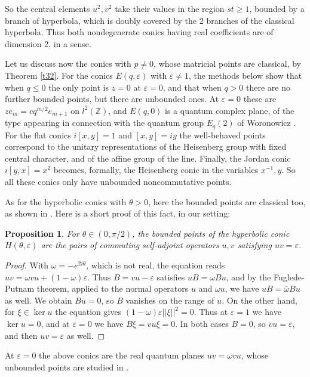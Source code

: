 \documentclass[11pt]{amsart}
\newtheorem{proposition}[theorem]{Proposition}
\theoremstyle{definition}
\begin{document}
So the central elements $u^2,v^2$ take their values in the region $st\geq1$, bounded by a branch of hyperbola, which is doubly covered by the 2 branches of the classical hyperbola. Thus both nondegenerate conics having real coefficients are of dimension 2, in a sense.

Let us discuss now the conics with $p\neq0$, whose matricial points are classical, by Theorem \ref{t32}. For the conics $E(q,\varepsilon)$ with $\varepsilon\neq1$, the methods below show that when $q\leq0$ the only point is $z=0$ at $\varepsilon=0$, and that when $q>0$ there are no further bounded points, but there are unbounded ones. At $\varepsilon=0$ these are $ze_m=cq^{m/2}e_{m+1}$ on $l^2(\mathbb Z)$, and $E(q,0)$ is a quantum complex plane, of the type appearing in connection with the quantum group $E_q(2)$ of Woronowicz \cite{wo1}. For the flat conics $i[x,y]=1$ and $[x,y]=iy$ the well-behaved points correspond to the unitary representations of the Heisenberg group with fixed central character, and of the affine group of the line. Finally, the Jordan conic $i[y,x]=x^2$ becomes, formally, the Heisenberg conic in the variables $x^{-1},y$. So all these conics only have unbounded noncommutative points.

As for the hyperbolic conics with $\theta>0$, here the bounded points are classical too, as shown in \cite{os1}. Here is a short proof of this fact, in our setting:

\begin{proposition}\label{p43}
For $\theta\in(0,\pi/2)$, the bounded points of the hyperbolic conic $H(\theta,\varepsilon)$ are the pairs of commuting self-adjoint operators $u,v$ satisfying $uv=\varepsilon$.
\end{proposition}

\begin{proof}
With $\omega=-e^{2i\theta}$, which is not real, the equation reads $uv=\omega vu+(1-\omega)\varepsilon$. Thus $B=vu-\varepsilon$ satisfies $uB=\omega Bu$, and by the Fuglede-Putnam theorem, applied to the normal operators $u$ and $\omega u$, we have $uB=\bar\omega Bu$ as well. We obtain $Bu=0$, so $B$ vanishes on the range of $u$. On the other hand, for $\xi\in\ker u$ the equation gives $(1-\omega)\varepsilon||\xi||^2=0$. Thus at $\varepsilon=1$ we have $\ker u=0$, and at $\varepsilon=0$ we have $B\xi=vu\xi=0$. In both cases $B=0$, so $vu=\varepsilon$, and then $uv=\varepsilon$ as well.
\end{proof}

At $\varepsilon=0$ the above conics are the real quantum planes $uv=\omega vu$, whose unbounded points are studied in \cite{sc3}.
\end{document}
